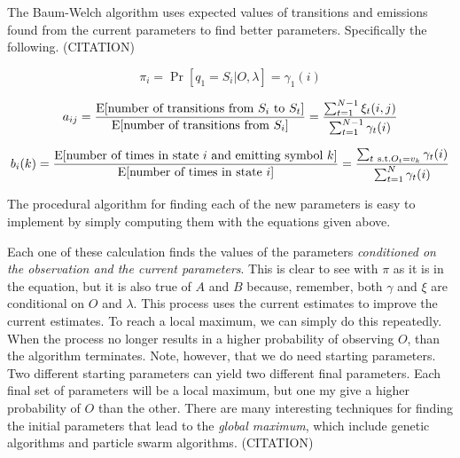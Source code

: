 The Baum-Welch algorithm uses expected values of transitions and
emissions found from the current parameters to find better parameters.
Specifically the following. (CITATION)

\begin{equation}
  \pi_i = \Pr[q_1 = S_i \vert O,\lambda] = \gamma_1(i)
\end{equation}

\begin{equation}
  a_{ij} = \frac{\mathrm{E}[\textrm{number of transitions from $S_i$ to
  $S_t$}]}{\mathrm{E}[\textrm{number of transitions from $S_i$}]} =
  \frac{\sum_{t=1}^{N-1} \xi_t(i,j)}{\sum_{t=1}^{N-1} \gamma_t(i)}
\end{equation}

\begin{equation}
  b_i(k) = \frac{\E[\textrm{number of times in state $i$ and emitting symbol
  $k$}]}{\E[\textrm{number of times in state $i$}]} = \frac{\sum_{t\ \textrm{s.t.} O_t = v_k} \gamma_t(i)}{\sum_{t=1}^N \gamma_t(i)}
\end{equation}

The procedural algorithm for finding each of the new parameters is easy
to implement by simply computing them with the equations given above.

Each one of these calculation finds the values of the parameters
\emph{conditioned on the observation and the current parameters}.
This is clear to see with $\pi$ as it is in the equation, but it is
also true of $A$ and $B$ because, remember, both $\gamma$ and $\xi$
are conditional on $O$ and $\lambda$. This process uses the current
estimates to improve the current estimates. To reach a local maximum,
we can simply do this repeatedly. When the process no longer results in
a higher probability of observing $O$, than the algorithm terminates.
Note, however, that we do need starting parameters. Two different
starting parameters can yield two different final parameters. Each final
set of parameters will be a local maximum, but one my give a higher
probability of $O$ than the other. There are many interesting techniques
for finding the initial parameters that lead to the \emph{global
maximum}, which include genetic algorithms and particle swarm
algorithms. (CITATION)
